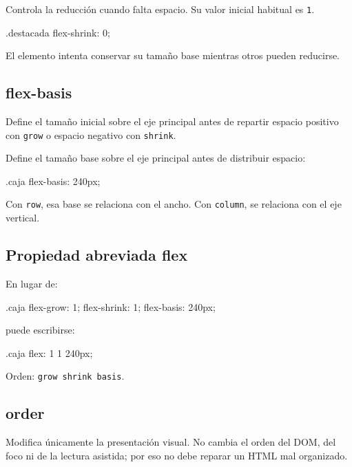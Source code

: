 \documentclass[11pt]{article}
\begin{document}
    Controla la reducción cuando falta espacio. Su valor inicial habitual es \texttt{1}.

    \begin{csscodedark}
        .destacada {
            flex-shrink: 0;
        }
    \end{csscodedark}

    El elemento intenta conservar su tamaño base mientras otros pueden reducirse.

    \subsection{flex-basis}

    Define el tamaño inicial sobre el eje principal antes de repartir espacio positivo con \texttt{grow} o espacio negativo con \texttt{shrink}.

    Define el tamaño base sobre el eje principal antes de distribuir espacio:

    \begin{csscodedark}
        .caja {
            flex-basis: 240px;
        }
    \end{csscodedark}

    Con \texttt{row}, esa base se relaciona con el ancho. Con \texttt{column}, se relaciona con el eje vertical.

    \subsection{Propiedad abreviada flex}

    En lugar de:

    \begin{csscodedark}
        .caja {
            flex-grow: 1;
            flex-shrink: 1;
            flex-basis: 240px;
        }
    \end{csscodedark}

    puede escribirse:

    \begin{csscodedark}
        .caja {
            flex: 1 1 240px;
        }
    \end{csscodedark}

    Orden: \texttt{grow shrink basis}.

    \subsection{order}

    Modifica únicamente la presentación visual. No cambia el orden del DOM, del foco ni de la lectura asistida; por eso no debe reparar un HTML mal organizado.
\end{document}
